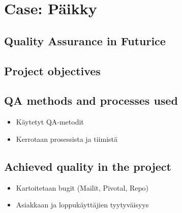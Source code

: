 
 \chapter{Case: Päikky}
 
 \section{Quality Assurance in Futurice}

 \section{Project objectives}

 \section{QA methods and processes used}
 
 \begin{itemize}
 
 \item Käytetyt QA-metodit
 \item Kerrotaan prosessista ja tiimistä
 
 \end{itemize}
 
 \section{Achieved quality in the project}

 \begin{itemize}
 
 \item Kartoitetaan bugit (Mailit, Pivotal, Repo)  
 \item Asiakkaan ja loppukäyttäjien tyytyväisyys
 
 \end{itemize}
 